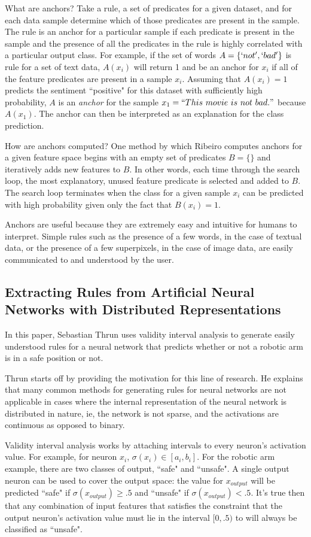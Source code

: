 \documentclass[12pt, letterpaper]{article}
\begin{document}
	What are anchors?
	Take a rule, a set of predicates for a given dataset, and for each data sample determine which of those predicates are present in the sample.
	The rule is an anchor for a particular sample if each predicate is present in the sample and the presence of all the predicates in the rule is highly correlated with a particular output class.
	For example, if the set of words $A = \{`not', `bad'\}$ is rule for a set of text data, $A(x_{i})$ will return 1 and be an anchor for $x_{i}$ if all of the feature predicates are present in a sample $x_{i}$.
	Assuming that $A(x_{i}) = 1$ predicts the sentiment ``positive" for this dataset with sufficiently high probability, $A$ is an \textit{anchor} for the sample $x_{1} = ``This\ movie\ is\ not\ bad."$ because $A(x_{1})$.
	The anchor can then be interpreted as an explanation for the class prediction.
	
	How are anchors computed? One method by which Ribeiro computes anchors for a given feature space begins with an empty set of predicates $B = \{\}$ and iteratively adds new features to $B$. In other words, each time through the search loop, the most explanatory, unused feature predicate is selected and added to $B$. The search loop terminates when the class for a given sample $x_{i}$ can be predicted with high probability given only the fact that $B(x_{i}) = 1$.
	
	Anchors are useful because they are extremely easy and intuitive for humans to interpret. Simple rules such as the presence of a few words, in the case of textual data, or the presence of a few  superpixels, in the case of image data, are easily communicated to and understood by the user.
\subsection{Extracting Rules from Artificial Neural Networks with Distributed Representations}
	In this paper, Sebastian Thrun uses validity interval analysis to generate easily understood rules for a neural network that predicts whether or not a robotic arm is in a safe position or not.
	
	Thrun starts off by providing the motivation for this line of research. He explains that many common methods for generating rules for neural networks are not applicable in cases where the internal representation of the neural network is distributed in nature, ie, the network is not sparse, and the activations are continuous as opposed to binary.
	
	Validity interval analysis works by attaching intervals to every neuron's activation value.
	For example, for neuron $x_{i}$, $\sigma(x_{i}) \in [a_{i}, b_{i}]$.
	For the robotic arm example, there are two classes of output, ``safe" and ``unsafe". A single output neuron can be used to cover the output space: the value for $x_{output}$ will be predicted ``safe" if $\sigma(x_{output}) \geq .5$ and ``unsafe" if $\sigma(x_{output}) < .5$.
	It's true then that any combination of input features that satisfies the constraint that the output neuron's activation value must lie in the interval $[0, .5)$ to will always be classified as ``unsafe". 
	
\end{document}
